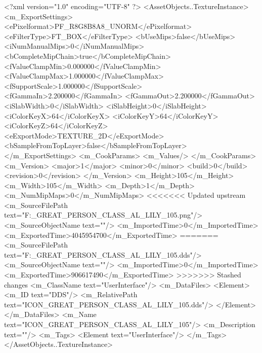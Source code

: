<?xml version="1.0" encoding="UTF-8" ?>
<AssetObjects..TextureInstance>
	<m_ExportSettings>
		<ePixelformat>PF_R8G8B8A8_UNORM</ePixelformat>
		<eFilterType>FT_BOX</eFilterType>
		<bUseMips>false</bUseMips>
		<iNumManualMips>0</iNumManualMips>
		<bCompleteMipChain>true</bCompleteMipChain>
		<fValueClampMin>0.000000</fValueClampMin>
		<fValueClampMax>1.000000</fValueClampMax>
		<fSupportScale>1.000000</fSupportScale>
		<fGammaIn>2.200000</fGammaIn>
		<fGammaOut>2.200000</fGammaOut>
		<iSlabWidth>0</iSlabWidth>
		<iSlabHeight>0</iSlabHeight>
		<iColorKeyX>64</iColorKeyX>
		<iColorKeyY>64</iColorKeyY>
		<iColorKeyZ>64</iColorKeyZ>
		<eExportMode>TEXTURE_2D</eExportMode>
		<bSampleFromTopLayer>false</bSampleFromTopLayer>
	</m_ExportSettings>
	<m_CookParams>
		<m_Values/>
	</m_CookParams>
	<m_Version>
		<major>1</major>
		<minor>0</minor>
		<build>0</build>
		<revision>0</revision>
	</m_Version>
	<m_Height>105</m_Height>
	<m_Width>105</m_Width>
	<m_Depth>1</m_Depth>
	<m_NumMipMaps>0</m_NumMipMaps>
<<<<<<< Updated upstream
	<m_SourceFilePath text="F:\DT\lilyimages\gpportrait\ICON_GREAT_PERSON_CLASS_AL_LILY_105.png"/>
	<m_SourceObjectName text=""/>
	<m_ImportedTime>0</m_ImportedTime>
	<m_ExportedTime>4045954700</m_ExportedTime>
=======
	<m_SourceFilePath text="F:\DT\lilyimages\all\ICON_GREAT_PERSON_CLASS_AL_LILY_105.dds"/>
	<m_SourceObjectName text=""/>
	<m_ImportedTime>0</m_ImportedTime>
	<m_ExportedTime>906617490</m_ExportedTime>
>>>>>>> Stashed changes
	<m_ClassName text="UserInterface"/>
	<m_DataFiles>
		<Element>
			<m_ID text="DDS"/>
			<m_RelativePath text="ICON_GREAT_PERSON_CLASS_AL_LILY_105.dds"/>
		</Element>
	</m_DataFiles>
	<m_Name text="ICON_GREAT_PERSON_CLASS_AL_LILY_105"/>
	<m_Description text=""/>
	<m_Tags>
		<Element text="UserInterface"/>
	</m_Tags>
</AssetObjects..TextureInstance>

